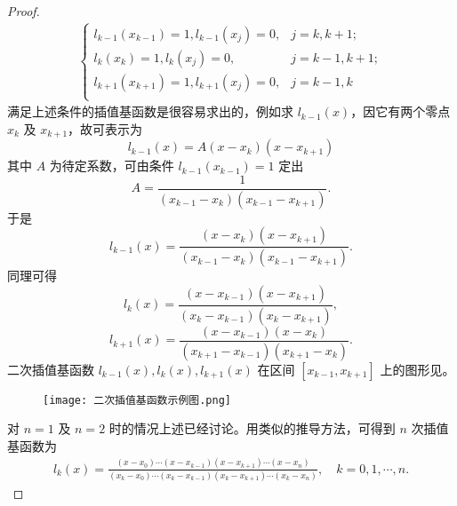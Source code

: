 \documentclass[../../main.tex]{subfiles}
\begin{document}
\begin{proof}
\begin{align*}
\begin{cases}
l_{k-1}(x_{k-1})=1,		l_{k-1}(x_j)=0,		&j=k,k+1;\\
l_k(x_k)=1,		l_k(x_j)=0,		&j=k-1,k+1;\\
l_{k+1}(x_{k+1})=1,		l_{k+1}(x_j)=0,		&j=k-1,k\\
\end{cases}
\end{align*}
满足上述条件的插值基函数是很容易求出的，例如求 $l_{k - 1}(x)$，因它有两个零点 $x_k$ 及 $x_{k + 1}$，故可表示为
\[
l_{k - 1}(x) = A(x - x_k)(x - x_{k + 1})
\]
其中 $A$ 为待定系数，可由条件 $l_{k - 1}(x_{k - 1}) = 1$ 定出 
\[
A = \frac{1}{(x_{k - 1} - x_k)(x_{k - 1} - x_{k + 1})}.
\]
于是
\[
l_{k - 1}(x) = \frac{(x - x_k)(x - x_{k + 1})}{(x_{k - 1} - x_k)(x_{k - 1} - x_{k + 1})}.
\]
同理可得 
\[
l_k(x) = \frac{(x - x_{k - 1})(x - x_{k + 1})}{(x_k - x_{k - 1})(x_k - x_{k + 1})},
\]
\[
l_{k + 1}(x) = \frac{(x - x_{k - 1})(x - x_k)}{(x_{k + 1} - x_{k - 1})(x_{k + 1} - x_k)}.
\]
二次插值基函数 $l_{k - 1}(x), l_k(x), l_{k + 1}(x)$ 在区间 $[x_{k - 1}, x_{k + 1}]$ 上的图形见。
\begin{figure}[H]
\centering
\texttt{[image: 二次插值基函数示例图.png]}
\caption{}
\label{figure:二次插值基函数示例图}
\end{figure}
对 $n = 1$ 及 $n = 2$ 时的情况上述已经讨论。用类似的推导方法，可得到 $n$ 次插值基函数为 
\begin{align*}
l_k(x) = \frac{(x - x_0) \cdots (x - x_{k - 1})(x - x_{k + 1}) \cdots (x - x_n)}{(x_k - x_0) \cdots (x_k - x_{k - 1})(x_k - x_{k + 1}) \cdots (x_k - x_n)}, \quad k = 0, 1, \cdots, n .
\end{align*}
\end{proof}
\end{document}
